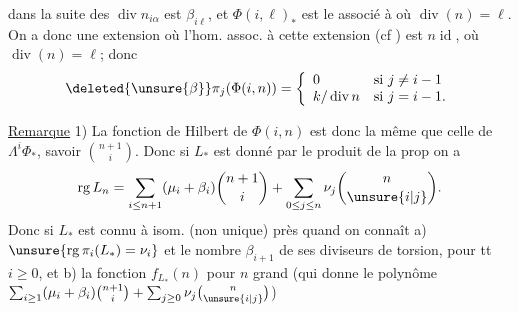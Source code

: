 dans la suite des $\operatorname{div}n_{i\alpha}$ est $\beta_{i\ell}$,
et $\Phi(i,\ell)_*$ est le 
 associé
à
où $\operatorname{div}(n)=\ell$. On a donc
une extension
où l'hom. assoc. à cette extension
(cf \unsure{\ldots}) est $n\operatorname{id}$, où $\operatorname{div}(n)=\ell$;
donc
\[
\deleted{\unsure{\beta}}\pi_j(\Phi(i,n))=
\left\{\begin{array}{ll}0&\text{si }j\neq i-1\\
k/\operatorname{div}n&\text{si }j=i-1.
\end{array}\right.
\]

\uline{Remarque} 1) La fonction de Hilbert de $\Phi(i,n)$
est donc la même que celle de $\Lambda^i\Phi_*$,
savoir $\binom{n+1}{i}$. Donc si $L_*$ est
donné par le produit de la prop on a
\[
\operatorname{rg}L_n=\sum_{i\leq n+1}(\mu_i+\beta_i)\binom{n+1}{i}
+\sum_{0\leq j\leq n}\nu_j\binom{n}{\unsure{i|j}}.
\]
Donc si $L_*$ est 
connu à isom. (non unique)
près quand on connaît a) $\unsure{\operatorname{rg}\pi_i(L_*)=\nu_i}$
et le nombre $\beta_{i+1}$ de ses diviseurs de
torsion, pour tt $i\geq0$, et b) la fonction
$f_{L_*}(n)$ pour $n$ grand (qui donne
  le polynôme
$\sum_{i\geq1}(\mu_i+\beta_i)\binom{n+1}{i}
+\sum_{j\geq0}\nu_j\binom{n}{\unsure{i|j}}$)
